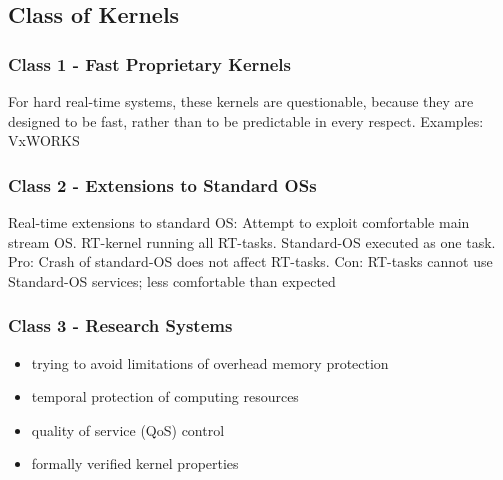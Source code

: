 \subsection{Class of Kernels}
\subsubsection{Class 1 - Fast Proprietary Kernels}
For hard real-time systems, these kernels are questionable, because they are designed to be fast, rather than to be predictable in every respect.
Examples: VxWORKS

\subsubsection{Class 2 - Extensions to Standard OSs}
Real-time extensions to standard OS: Attempt to exploit comfortable main stream OS. RT-kernel running all RT-tasks. Standard-OS executed as one task.
Pro: Crash of standard-OS does not affect RT-tasks. Con: RT-tasks cannot use Standard-OS services; less comfortable than expected 

\subsubsection{Class 3 - Research Systems}
\begin{itemize}[noitemsep]
\item trying to avoid limitations of overhead memory protection
\item temporal protection of computing resources 
\item quality of service (QoS) control
\item formally verified kernel properties
\end{itemize}

\cleardoublepage